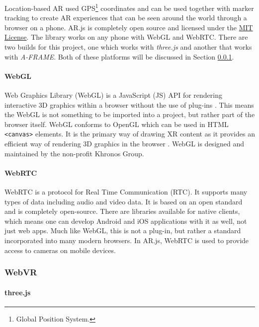 Location-based AR used GPS\footnote{Global Position System.} coordinates and can be used together with marker tracking to create AR experiences that can be seen around the world through a browser on a phone. AR.js is completely open source and licensed under the \href{https://mit-license.org/}{MIT License}. The library works on any phone with WebGL and WebRTC. There are two builds for this project, one which works with \textit{three.js} and another that works with \textit{A-FRAME}. Both of these platforms will be discussed in Section \ref{subsubsec:webvr}. 

\paragraph{WebGL} 

Web Graphics Library (WebGL) is a JavaScript (JS) API for rendering interactive 3D graphics within a browser without the use of plug-ins \cite{WebGL2Da70online}. This means the WebGL is not something to be imported into a project, but rather part of the browser itself. WebGL conforms to OpenGL which can be used in HTML \texttt{<canvas>} elements. It is the primary way of drawing XR content as it provides an efficient way of rendering 3D graphics in the browser \cite{WebXRSam30online}. WebGL is designed and maintained by the non-profit Khronos Group.

\paragraph{WebRTC}

WebRTC is a protocol for Real Time Communication (RTC). It supports many types of data including audio and video data. It is based on an open standard and is completely open-source. There are libraries available for native clients, which means one can develop Android and iOS applications with it as well, not just web apps. Much like WebGL, this is not a plug-in, but rather a standard incorporated into many modern browsers. In AR.js, WebRTC is used to provide access to cameras on mobile devices.

\subsubsection{WebVR}\label{subsubsec:webvr}

\paragraph{three.js}

